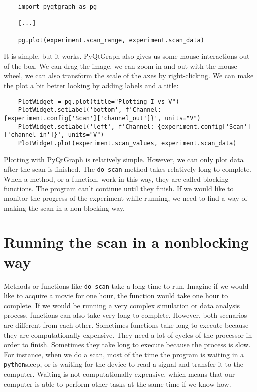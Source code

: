 \begin{verbatim}
    import pyqtgraph as pg

    [...]

    pg.plot(experiment.scan_range, experiment.scan_data)
\end{verbatim}

It is simple, but it works. PyQtGraph also gives us some mouse interactions out of the box. We can drag the image, we can zoom in and out with the mouse wheel, we can also transform the scale of the axes by right-clicking. We can make the plot a bit better looking by adding labels and a title:

\begin{verbatim}
    PlotWidget = pg.plot(title="Plotting I vs V")
    PlotWidget.setLabel('bottom', f'Channel: {experiment.config['Scan']['channel_out']}', units="V")
    PlotWidget.setLabel('left', f'Channel: {experiment.config['Scan']['channel_in']}', units="V")
    PlotWidget.plot(experiment.scan_values, experiment.scan_data)
\end{verbatim}

Plotting with PyQtGraph is relatively simple. However, we can only plot data after the scan is finished. The \texttt{do\_scan} method takes relatively long to complete. When a method, or a function, work in this way, they are called blocking functions. The program can't continue until they finish. If we would like to monitor the progress of the experiment while running, we need to find a way of making the scan in a non-blocking way.

\section{Running the scan in a nonblocking way}\label{section:nonblocking}
Methods or functions like \texttt{do\_scan} take a long time to run. Imagine if we would like to acquire a movie for one hour, the function would take one hour to complete. If we would be running a very complex simulation or data analysis process, functions can also take very long to complete. However, both scenarios are different from each other. Sometimes functions take long to execute because they are computationally expensive. They need a lot of cycles of the processor in order to finish. Sometimes they take long to execute because the process is slow. For instance, when we do a scan, most of the time the program is waiting in a \texttt{python}{sleep}, or is waiting for the device to read a signal and transfer it to the computer. Waiting is not computationally expensive, which means that our computer is able to perform other tasks at the same time if we know how.

